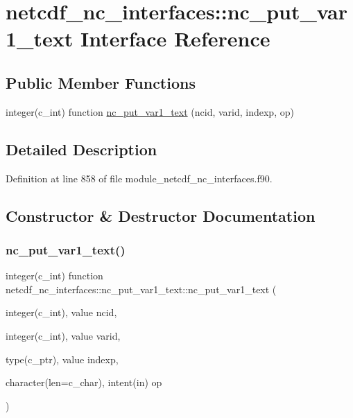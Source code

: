 \hypertarget{interfacenetcdf__nc__interfaces_1_1nc__put__var1__text}{}\section{netcdf\+\_\+nc\+\_\+interfaces\+:\+:nc\+\_\+put\+\_\+var1\+\_\+text Interface Reference}
\label{interfacenetcdf__nc__interfaces_1_1nc__put__var1__text}
\subsection*{Public Member Functions}
\begin{DoxyCompactItemize}
\item 
integer(c\+\_\+int) function \hyperlink{interfacenetcdf__nc__interfaces_1_1nc__put__var1__text_a8c84ff26723ae5817c264474f284e801}{nc\+\_\+put\+\_\+var1\+\_\+text} (ncid, varid, indexp, op)
\end{DoxyCompactItemize}


\subsection{Detailed Description}


Definition at line 858 of file module\+\_\+netcdf\+\_\+nc\+\_\+interfaces.\+f90.



\subsection{Constructor \& Destructor Documentation}
\mbox{\label{interfacenetcdf__nc__interfaces_1_1nc__put__var1__text_a8c84ff26723ae5817c264474f284e801}} 
\subsubsection{\texorpdfstring{nc\+\_\+put\+\_\+var1\+\_\+text()}{nc\_put\_var1\_text()}}
{\footnotesize\ttfamily integer(c\+\_\+int) function netcdf\+\_\+nc\+\_\+interfaces\+::nc\+\_\+put\+\_\+var1\+\_\+text\+::nc\+\_\+put\+\_\+var1\+\_\+text (\begin{DoxyParamCaption}\item[{integer(c\+\_\+int), value}]{ncid,  }\item[{integer(c\+\_\+int), value}]{varid,  }\item[{type(c\+\_\+ptr), value}]{indexp,  }\item[{character(len=c\+\_\+char), intent(in)}]{op }\end{DoxyParamCaption})}



